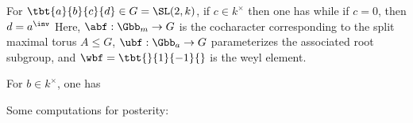 
For $\tbt{a}{b}{c}{d} \in G = \SL(2,k)$, if $c \in k^\times$ then one has 
while if $c=0$, then $d=a^\inv$
Here, $\abf: \Gbb_m \to G$ is the cocharacter corresponding to the split maximal torus $A \leq G$, $\ubf: \Gbb_a \to G$ parameterizes the associated root subgroup, and $\wbf = \tbt{}{1}{-1}{}$ is the weyl element.

For $b \in k^\times$, one has 


Some computations for posterity: 
